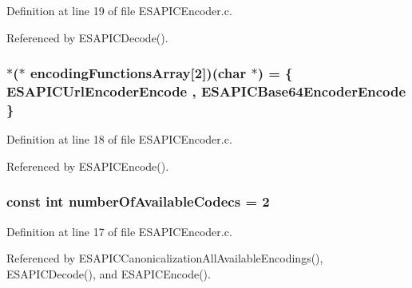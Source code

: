 Definition at line 19 of file ESAPICEncoder.c.



Referenced by ESAPICDecode().

\hypertarget{a00022_a370f5a068adf4f7622dbaf6125a213e3}{
\subsubsection[{encodingFunctionsArray}]{$\ast$($\ast$  {\bf encodingFunctionsArray}\mbox{[}2\mbox{]})(char $\ast$) = \{ ESAPICUrlEncoderEncode , ESAPICBase64EncoderEncode \}}}
\label{d7/de0/a00022_a370f5a068adf4f7622dbaf6125a213e3}


Definition at line 18 of file ESAPICEncoder.c.



Referenced by ESAPICEncode().

\hypertarget{a00022_a2e9860061ee6616b276f7cab7e0fba71}{
\subsubsection[{numberOfAvailableCodecs}]{\setlength{\rightskip}{0pt plus 5cm}const int {\bf numberOfAvailableCodecs} = 2}}
\label{d7/de0/a00022_a2e9860061ee6616b276f7cab7e0fba71}


Definition at line 17 of file ESAPICEncoder.c.



Referenced by ESAPICCanonicalizationAllAvailableEncodings(), ESAPICDecode(), and ESAPICEncode().

